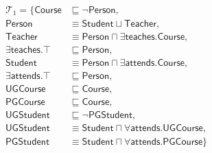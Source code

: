 \documentclass{amsart}
\begin{document}
   \begin{align*}
  \mathcal{T}_1 = \{\mathsf{Course} &\sqsubseteq \neg \mathsf{Person},\\
  \mathsf{Person} &\equiv \mathsf{Student} \sqcup \mathsf{Teacher}, \\ 
  \mathsf{Teacher} &\equiv \mathsf{Person} \sqcap \exists\mathsf{teaches}.\mathsf{Course}, \\
  \exists\mathsf{teaches}.\top &\sqsubseteq \mathsf{Person},\\
  \mathsf{Student} &\equiv \mathsf{Person} \sqcap \exists\mathsf{attends}.\mathsf{Course}, \\
  \exists\mathsf{attends}.\top &\sqsubseteq \mathsf{Person},\\ 
  \mathsf{UGCourse} &\sqsubseteq \mathsf{Course},\\
  \mathsf{PGCourse} &\sqsubseteq \mathsf{Course},\\
   \mathsf{UGStudent} &\sqsubseteq \neg\mathsf{PGStudent},\\
  \mathsf{UGStudent} &\equiv\mathsf{Student} \sqcap  \forall\mathsf{attends}.\mathsf{UGCourse},\\
  \mathsf{PGStudent} &\equiv \mathsf{Student} \sqcap \forall\mathsf{attends}.\mathsf{PGCourse}\}
  \end{align*}   
  
\end{document}
